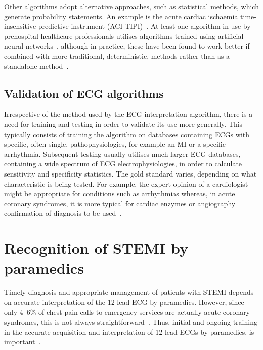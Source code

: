 Other algorithms adopt alternative approaches, such as statistical methods, which generate probability statements. An example is the acute cardiac ischaemia time-insensitive predictive instrument (ACI-TIPI)~\citep{selker_use_1998}. At least one algorithm in use by prehospital healthcare professionals utilises algorithms trained using artificial neural networks~\citep{eggers_artificial_2007}, although in practice, these have been found to work better if combined with more traditional, deterministic, methods rather than as a standalone method~\citep{physio_control_glasgow_2009-1}. 

\subsection{Validation of ECG algorithms}
\label{validationofecgalgorithms}

Irrespective of the method used by the ECG interpretation algorithm, there is a need for training and testing in order to validate its use more generally. This typically consists of training the algorithm on databases containing ECGs with specific, often single, pathophysiologies, for example an MI or a specific arrhythmia. Subsequent testing usually utilises much larger ECG databases, containing a wide spectrum of ECG electrophysiologies, in order to calculate sensitivity and specificity statistics. The gold standard varies, depending on what characteristic is being tested. For example, the expert opinion of a cardiologist might be appropriate for conditions such as arrhythmias whereas, in acute coronary syndromes, it is more typical for cardiac enzymes or angiography confirmation of diagnosis to be used~\citep{ge_healthcare_marquette_2008,ge_healthcare_marquette_2007}. 

\section{Recognition of STEMI by paramedics}
\label{recognitionofstemibyparamedics}

Timely diagnosis and appropriate management of patients with STEMI depends on accurate interpretation of the 12-lead ECG by paramedics. However, since only 4--6\% of chest pain calls to emergency services are actually acute coronary syndromes, this is not always straightforward~\citep{deakin_does_2006}. Thus, initial and ongoing training in the accurate acquisition and interpretation of 12-lead ECGs by paramedics, is important~\citep{ting_implementation_2008,ducas_transmit_2012}.

